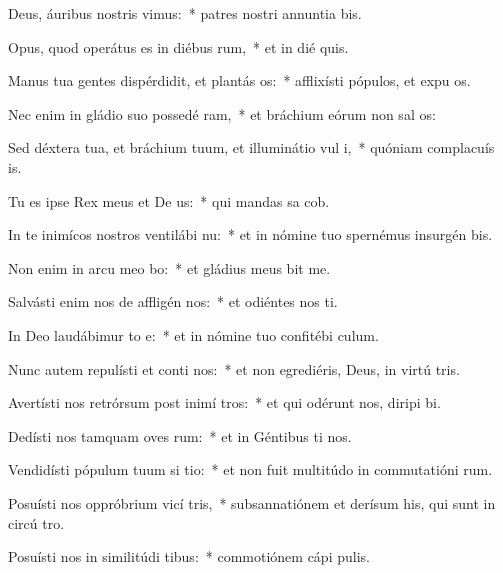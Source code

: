 \item Deus, áuribus nostris vimus:~* patres nostri annuntia bis.
\item Opus, quod operátus es in diébus rum,~* et in dié quis.
\item Manus tua gentes dispérdidit, et plantás os:~* afflixísti pópulos, et expu os.
\item Nec enim in gládio suo possedé ram,~* et bráchium eórum non sal os:
\item Sed déxtera tua, et bráchium tuum, et illuminátio vul i,~* quóniam complacuís  is.
\item Tu es ipse Rex meus et De us:~* qui mandas sa cob.
\item In te inimícos nostros ventilábi nu:~* et in nómine tuo spernémus insurgén  bis.
\item Non enim in arcu meo bo:~* et gládius meus  bit me.
\item Salvásti enim nos de affligén nos:~* et odiéntes nos ti.
\item In Deo laudábimur to e:~* et in nómine tuo confitébi  culum.
\item Nunc autem repulísti et conti nos:~* et non egrediéris, Deus, in virtú tris.
\item Avertísti nos retrórsum post inimí tros:~* et qui odérunt nos, diripi bi.
\item Dedísti nos tamquam oves rum:~* et in Géntibus ti nos.
\item Vendidísti pópulum tuum si tio:~* et non fuit multitúdo in commutatióni rum.
\item Posuísti nos oppróbrium vicí tris,~* subsannatiónem et derísum his, qui sunt in circú tro.
\item Posuísti nos in similitúdi tibus:~* commotiónem cápi  pulis.
